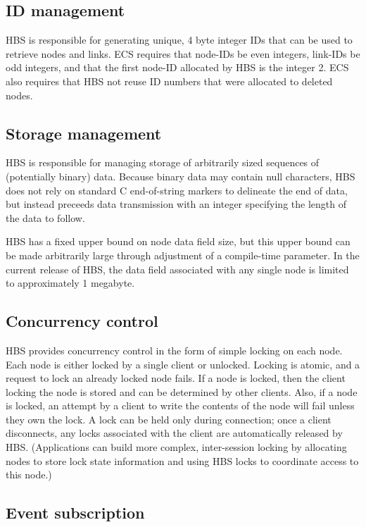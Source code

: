 \subsection{ID management}  

HBS is responsible for generating unique, 4 byte integer IDs that can be
used to retrieve nodes and links.  ECS requires that node-IDs be even
integers, link-IDs be odd integers, and that the first node-ID allocated
by HBS is the integer 2.  ECS also requires that HBS not reuse ID
numbers that were allocated to deleted nodes. 

\subsection{Storage management}  

HBS is responsible for managing storage of arbitrarily sized sequences of
(potentially binary) data.  Because binary data may contain null
characters, HBS does not rely on standard C end-of-string markers to
delineate the end of data, but instead preceeds data transmission with an
integer specifying the length of the  data to follow.
 
HBS has a fixed upper bound on node data field size, but this upper
bound can be made arbitrarily large through adjustment of a 
compile-time parameter. 
In the 
current release of HBS, the data field associated with any
single node is limited to approximately 1 megabyte.

\subsection{Concurrency control}  

HBS provides concurrency control in the form of simple locking on each
node.  Each node is either locked by a single client or unlocked. Locking
is atomic, and a request to lock an already locked node fails. If a node
is locked, then the client locking the node is stored and can be
determined by other clients.  Also, if a node is locked, an attempt by a
client to write the contents of the node will fail unless they own the
lock. A lock can be held only during connection; once a client
disconnects, any locks associated with the client are automatically
released by HBS.  (Applications can build more complex, inter-session
locking by allocating nodes to store lock state information and using HBS
locks to coordinate access to this node.)

\subsection{Event subscription}  

